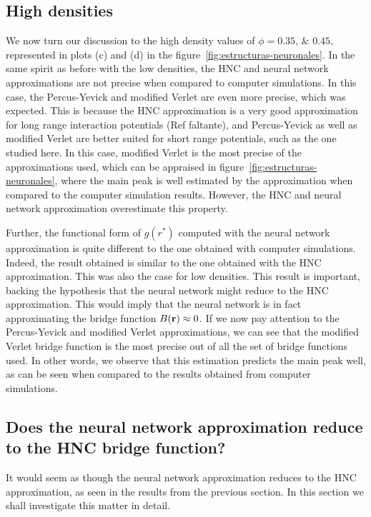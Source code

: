 \subsection{High densities}
We now turn our discussion to the high density values of $\phi=\numlist{0.35; 0.45}$,
represented in plots (c) and (d) in the figure~\ref{fig:estructuras-neuronales}.
In the same spirit as before with the low densities, the HNC and neural network 
approximations are not precise when compared to computer simulations. In this case,
the Percus-Yevick and modified Verlet are even more precise, which was expected.
This is because the HNC approximation is a very good approximation for long range
interaction potentials (Ref faltante), and Percus-Yevick as well as modified Verlet are 
better suited for short range potentials, such as the one studied here.
In this case, modified Verlet is the most precise of the approximations used, which
can be appraised in figure~\ref{fig:estructuras-neuronales}, where the main peak
is well estimated by the approximation when compared to the computer simulation
results. However, the HNC and neural network approximation overestimate this property.

Further, the functional form of $g(r^*)$ computed with the neural network approximation 
is quite different to the one obtained with computer simulations. Indeed, the result
obtained is similar to the one obtained with the HNC approximation. This was also the
case for low densities. This result is important, backing the hypothesis that the
neural network might reduce to the HNC approximation.
This would imply that the neural network is in fact approximating the bridge function
$B(\mathbf{r}) \approx 0$. If we now pay attention to the Percus-Yevick and modified Verlet
approximations, we can see that the modified Verlet bridge function is the most precise
out of all the set of bridge functions used. In other words, we observe that this
estimation predicts the main peak well, as can be seen when compared to the results
obtained from computer simulations.

\subsection{Does the neural network approximation reduce to the HNC bridge function?}
It would seem as though the neural network approximation reduces to the HNC
approximation, as seen in the results from the previous section. In this section
we shall investigate this matter in detail.

